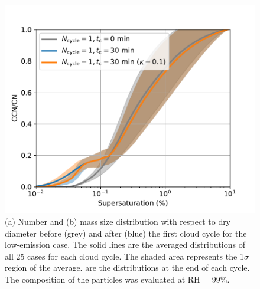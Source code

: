\documentclass[edeposit,fullpage]{uiucthesis2009}
\begin{document}
\begin{figure}
    \centering
    \includegraphics[scale=0.5]{chap3_figs/fig_sup3.pdf}
    \caption{(a) Number and (b) mass size distribution with respect to
      dry diameter before (grey) and after (blue) the first cloud
      cycle for the low-emission case.  The solid lines are the
      averaged distributions of all 25 cases for each cloud cycle. The
      shaded area represents the 1$\sigma$ region of the average.  are
      the distributions at the end of each cycle. The composition of
      the particles was evaluated at RH = 99\%.}
    \label{fig:mass-num-dist}
\end{figure}
\end{document}

